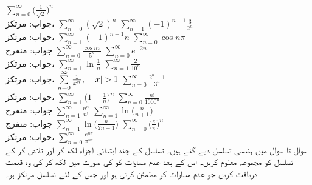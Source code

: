 $\sum\limits_{n=0}^{\infty}\big(\frac{1}{\sqrt{2}}\big)^n$\\
جواب:\quad
مرتکز، 
$\sum\limits_{n=0}^{\infty}(\sqrt{2})^n$
$\sum\limits_{n=1}^{\infty}(-1)^{n+1}\frac{3}{2^n}$\\
جواب:\quad
مرتکز، 
$\sum\limits_{n=1}^{\infty}(-1)^{n+1}n$
$\sum\limits_{n=0}^{\infty}\cos n\pi$\\
جواب:\quad
منفرج
$\sum\limits_{n=0}^{\infty}\frac{\cos n\pi}{5^n}$
$\sum\limits_{n=0}^{\infty}e^{-2n}$\\
جواب:\quad
مرتکز، 
$\sum\limits_{n=1}^{\infty}\ln \frac{1}{n}$
$\sum\limits_{n=1}^{\infty}\frac{2}{10^n}$\\
جواب:\quad
مرتکز، 
$\sum\limits_{n=0}^{\infty}\frac{1}{x^n},\quad \abs{x}>1$
$\sum\limits_{n=0}^{\infty}\frac{2^n-1}{3^n}$\\
جواب:\quad
مرتکز، 
$\sum\limits_{n=1}^{\infty}\big(1-\frac{1}{n}\big)^n$
$\sum\limits_{n=0}^{\infty}\frac{n!}{1000^n}$\\
جواب:\quad
منفرج
$\sum\limits_{n=1}^{\infty}\frac{n^n}{n!}$
$\sum\limits_{n=1}^{\infty}\ln\big(\frac{n}{n+1}\big)$\\
جواب:\quad
منفرج
$\sum\limits_{n=1}^{\infty}\ln \big(\frac{n}{2n+1}\big)$
$\sum\limits_{n=0}^{\infty}\big(\frac{e}{\pi}\big)^n$\\
جواب:\quad
مرتکز، 
$\sum\limits_{n=0}^{\infty}\frac{e^{n\pi}}{\pi^{ne}}$
\\
سوال  تا سوال  میں ہندسی تسلسل دیے گئے ہیں۔ تسلسل کے چند ابتدائی اجزاء لکھ کر  اور  تلاش کر کے تسلسل کو مجموعہ معلوم کریں۔ اس کے بعد عدم مساوات  کو  کی صورت میں لکھ کر  کی وہ قیمت دریافت کریں جو عدم مساوات کو مطمئن کرتی ہو اور جس کے لئے تسلسل مرتکز ہو۔  

